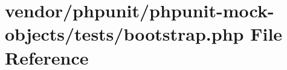 \section{vendor/phpunit/phpunit-\/mock-\/objects/tests/bootstrap.php File Reference}
\label{phpunit_2phpunit-mock-objects_2tests_2bootstrap_8php}

